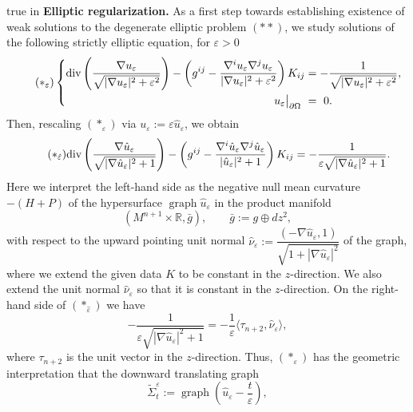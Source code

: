 \documentclass[11pt]{amsart}
\DeclareMathOperator{\graph}{graph} \DeclareMathOperator{\closure}{Closure}
\def\wt{\widetilde}
\begin{document}
 true in
\textbf{Elliptic regularization.} As a first step towards establishing existence of weak solutions to the degenerate elliptic problem $(**)$, we study solutions of the following strictly elliptic equation, for $\varepsilon>0$
\[\tag{$*_{\varepsilon}$}
\left\lbrace
\begin{aligned}
 \mbox{div}\left(\dfrac{\nabla u_{\varepsilon}}{\sqrt{|\nabla u_{\varepsilon}|^2+\varepsilon^2}}\right)-\left(g^{ij}-\dfrac{\nabla^iu_{\varepsilon}\nabla^ju_{\varepsilon}}{|\nabla u_{\varepsilon}|^2+\varepsilon^2}\right)K_{ij}&=-\dfrac{1}{\sqrt{|\nabla u_{\varepsilon}|^2+\varepsilon^2}},\\
u_{\varepsilon}\big|_{\partial\Omega}\,\,&=\,\,0.
\end{aligned}
\right.
\]
Then, rescaling $(*_{\varepsilon})$ via $u_{\varepsilon}:=\varepsilon\hat{u}_{\varepsilon}$, we obtain
\[\tag{$*_{\hat{\varepsilon}}$}
\mbox{div}\left(\dfrac{\nabla \hat{u}_{\varepsilon}}{\sqrt{|\nabla \hat{u}_{\varepsilon}|^2+1}}\right)-\left(g^{ij}-\dfrac{\nabla^i\hat{u}_{\varepsilon}\nabla^j\hat{u}_{\varepsilon}}{|\hat{u}_{\varepsilon}|^2+1}\right)K_{ij}=-\dfrac{1}{\varepsilon\sqrt{|\nabla \hat{u}_{\varepsilon}|^2+1}}.
\]
Here we interpret the left-hand side as the negative null mean curvature $-(H+P)$ of the hypersurface $\graph \hat{u}_{\varepsilon}$ in the product manifold 
\begin{equation}\label{product}
(M^{n+1}\times\mathbb{R},\bar{g}),\quad\quad\bar{g}:=g\oplus dz^2,
\end{equation}
with respect to the upward pointing unit normal $\hat{\nu}_{\varepsilon}:=\dfrac{(-\nabla\hat{u}_{\varepsilon},1)}{\sqrt{1+|\nabla\hat{u}_{\varepsilon}|^2}}$ of the graph, where we extend the given data $K$ to be constant in the $z$-direction. We also extend the unit  normal $\hat{\nu}_{\varepsilon}$ so that it is constant in the $z$-direction. On the right-hand side of $(*_{\hat{\varepsilon}})$ we have 
\begin{equation}\label{gradterm}
-\dfrac{1}{\varepsilon\sqrt{|\nabla \hat{u}_{\varepsilon}|^2+1}}=-\frac{1}{\varepsilon}\langle\tau_{n+2},\hat{\nu}_{\varepsilon}\rangle,
\end{equation}
where $\tau_{n+2}$ is the unit vector in the $z$-direction. Thus, $(*_{\varepsilon})$ has the geometric interpretation that the downward translating graph
\begin{equation} \label{graph}
 \wt\Sigma^{\varepsilon}_t:=\graph \left(\hat{u}_{\varepsilon}-\dfrac{t}{\varepsilon}\right),
\end{equation}
\end{document}
